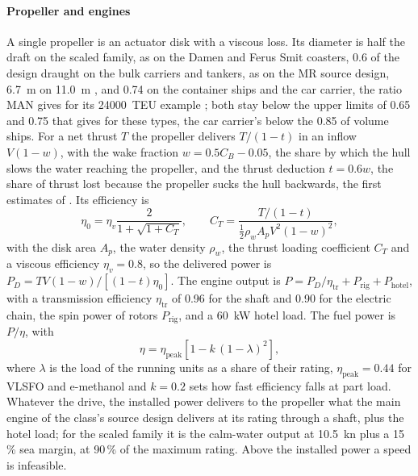 \paragraph{Propeller and engines} A single propeller is an actuator disk with a viscous loss. Its diameter is half the draft on the scaled family, as on the Damen and Ferus Smit coasters, 0.6 of the design draught on the bulk carriers and tankers, as on the MR source design, \SI{6.7}{m} on \SI{11.0}{m} \citep{man2019mr}, and 0.74 on the container ships and the car carrier, the ratio MAN gives for its \num{24000}~TEU example \citep{man2011}; both stay below the upper limits of 0.65 and 0.75 that \citet{man2011} gives for these types, the car carrier's below the 0.85 of volume ships. For a net thrust $T$ the propeller delivers $T/(1-t)$ in an inflow $V(1-w)$, with the wake fraction $w=0.5C_B-0.05$, the share by which the hull slows the water reaching the propeller, and the thrust deduction $t=0.6w$, the share of thrust lost because the propeller sucks the hull backwards, the first estimates of \citet{man2011}. Its efficiency is
\begin{equation}
\eta_0 = \eta_v \frac{2}{1+\sqrt{1+C_T}}, \qquad C_T = \frac{T/(1-t)}{\tfrac12\rho_w A_p V^2(1-w)^2},
\end{equation}
with the disk area $A_p$, the water density $\rho_w$, the thrust loading coefficient $C_T$ and a viscous efficiency $\eta_v=0.8$, so the delivered power is $P_D = T V (1-w) / [(1-t)\eta_0]$. The engine output is $P = P_D/\eta_\mathrm{tr} + P_\mathrm{rig} + P_\mathrm{hotel}$, with a transmission efficiency $\eta_\mathrm{tr}$ of 0.96 for the shaft and 0.90 for the electric chain, the spin power of rotors $P_\mathrm{rig}$, and a \SI{60}{kW} hotel load. The fuel power is $P/\eta$, with
\begin{equation}
\eta = \eta_\mathrm{peak}\left[1-k\,(1-\lambda)^2\right],
\end{equation}
where $\lambda$ is the load of the running units as a share of their rating, $\eta_\mathrm{peak}=0.44$ for VLSFO and e-methanol and $k=0.2$ sets how fast efficiency falls at part load. Whatever the drive, the installed power delivers to the propeller what the main engine of the class's source design delivers at its rating through a shaft, plus the hotel load; for the scaled family it is the calm-water output at \SI{10.5}{kn} plus a 15\,\% sea margin, at 90\,\% of the maximum rating. Above the installed power a speed is infeasible.

